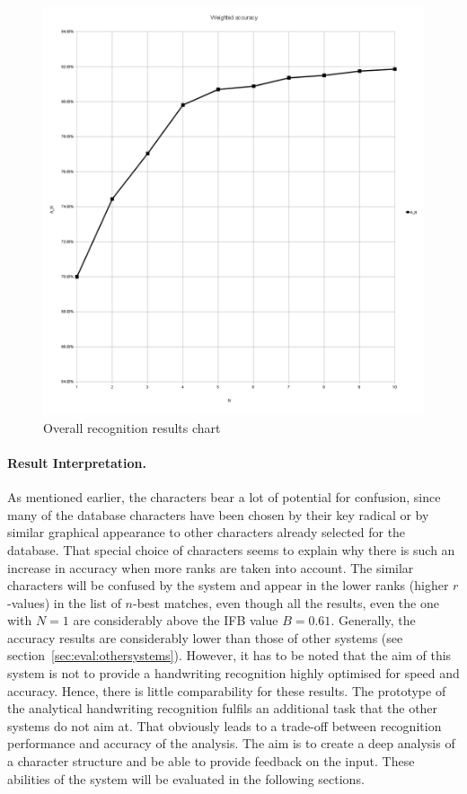 \begin{figure}[htbp]
  \begin{center}
    \includegraphics[scale=0.5]{images/weightedAccuracyOverall.png}
    \caption{Overall recognition results chart}
    \label{fig:eval:overallrecognitionresults}
  \end{center}
\end{figure}

\paragraph{Result Interpretation.}
As mentioned earlier, the characters bear a lot of potential for confusion,
since many of the database characters have been chosen by their key radical
or by similar graphical appearance to other characters already selected for 
the database.
That special choice of characters seems to explain why there is such an
increase in accuracy when more ranks are taken into account.
The similar characters will be confused by the system and appear in
the lower ranks (higher \(r\)-values) in the list of \(n\)-best matches,
even though all the results, even the one with \(N = 1\) are considerably above
the IFB value \(B=0.61\).
Generally, the accuracy results are considerably lower than those of other
systems (see section~\ref{sec:eval:othersystems}). 
However, it has to be noted that the aim of this system is not 
to provide a handwriting recognition highly optimised for speed and accuracy.
Hence, there is little comparability for these results. 
The prototype of the analytical handwriting recognition fulfils an additional 
task that the other systems do not aim at. That obviously leads to a trade-off
between recognition performance and accuracy of the analysis.
The aim is to create a deep analysis of a character structure and
be able to provide feedback on the input. These abilities of the system will
be evaluated in the following sections.


